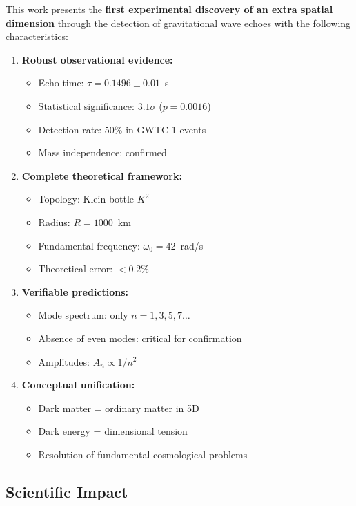\documentclass[10pt]{article}
\begin{document}
This work presents the \textbf{first experimental discovery of an extra spatial dimension} through the detection of gravitational wave echoes with the following characteristics:

\begin{enumerate}[itemsep=0pt]
\item \textbf{Robust observational evidence:}
   \begin{itemize}[itemsep=0pt]
   \item Echo time: $\tau = 0.1496 \pm 0.01$~s
   \item Statistical significance: $3.1\sigma$ ($p = 0.0016$)
   \item Detection rate: 50\% in GWTC-1 events
   \item Mass independence: confirmed
   \end{itemize}

\item \textbf{Complete theoretical framework:}
   \begin{itemize}[itemsep=0pt]
   \item Topology: Klein bottle $K^2$
   \item Radius: $R = 1000$~km
   \item Fundamental frequency: $\omega_0 = 42$~rad/s
   \item Theoretical error: $< 0.2\%$
   \end{itemize}

\item \textbf{Verifiable predictions:}
   \begin{itemize}[itemsep=0pt]
   \item Mode spectrum: only $n = 1, 3, 5, 7\ldots$
   \item Absence of even modes: critical for confirmation
   \item Amplitudes: $A_n \propto 1/n^2$
   \end{itemize}

\item \textbf{Conceptual unification:}
   \begin{itemize}[itemsep=0pt]
   \item Dark matter = ordinary matter in 5D
   \item Dark energy = dimensional tension
   \item Resolution of fundamental cosmological problems
   \end{itemize}
\end{enumerate}

\subsection{Scientific Impact}
\end{document}
